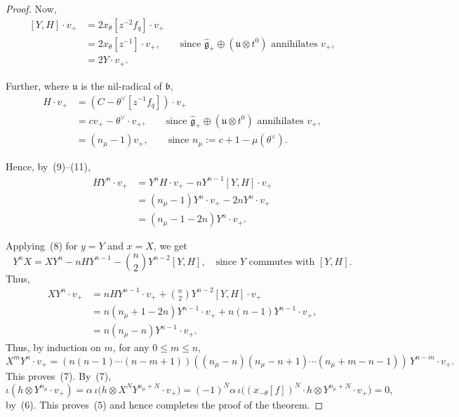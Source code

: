 \documentclass[12pt]{article}
\begin{document}
\begin{proof}
    Now,
    \[
        \begin{aligned}
            [Y,H]\cdot v_+ & = 2x_\theta[z^{-2}f_q]\cdot v_+      \\
                           & = 2x_\theta[z^{-1}]\cdot v_+, \qquad
            \text{since }\widehat{\mathfrak g}_+\oplus(\mathfrak u\otimes t^0)
            \text{ annihilates }v_+,                              \\
                           & =2Y\cdot v_+.
        \end{aligned}
        \tag{10}
    \]

    Further, where $\mathfrak u$ is the nil-radical of $\mathfrak b$,
    \[
        \begin{aligned}
            H\cdot v_+
             & = (C-\theta^\vee[z^{-1}f_q])\cdot v_+ \\
             & = cv_+ - \theta^\vee\cdot v_+, \qquad
            \text{since }\widehat{\mathfrak g}_+\oplus(\mathfrak u\otimes t^0)
            \text{ annihilates }v_+,                 \\
             & =(n_\mu-1)v_+,
            \qquad\text{since }n_\mu:=c+1-\mu(\theta^\vee).
        \end{aligned}
        \tag{11}
    \]

    Hence, by~(9)–(11),
    \[
        \begin{aligned}
            HY^n\cdot v_+
             & =Y^nH\cdot v_+ - nY^{n-1}[Y,H]\cdot v_+ \\
             & =(n_\mu-1)Y^n\cdot v_+ - 2nY^n\cdot v_+ \\
             & =(n_\mu-1-2n)Y^n\cdot v_+.
        \end{aligned}
        \tag{12}
    \]

    Applying~(8) for $y=Y$ and $x=X$, we get
    \[
        Y^nX = XY^n - nHY^{n-1} - \binom{n}{2}Y^{n-2}[Y,H],
        \quad\text{since $Y$ commutes with $[Y,H]$.}
    \]
    Thus,
    \[
        \begin{aligned}
            XY^n\cdot v_+
             & = nHY^{n-1}\cdot v_+
            + \binom{n}{2}Y^{n-2}[Y,H]\cdot v_+ \\
             & = n(n_\mu+1-2n)Y^{n-1}\cdot v_+
            + n(n-1)Y^{n-1}\cdot v_+,           \\
             & = n(n_\mu-n)Y^{n-1}\cdot v_+.
        \end{aligned}
    \]
    Thus, by induction on $m$, for any $0\le m\le n$,
    \[
        X^mY^n\cdot v_+
        = (n(n-1)\cdots(n-m+1))
        ((n_\mu-n)(n_\mu-n+1)\cdots(n_\mu+m-n-1))\,Y^{n-m}\cdot v_+.
    \]
    This proves~(7).  By~(7),
    \[
        \iota(h\otimes Y^{n_\mu}\cdot v_+)
        =\alpha\,\iota\bigl(h\otimes X^N Y^{n_\mu+N}\cdot v_+\bigr)
        =(-1)^N\alpha\,\iota\bigl((x_{-\theta}[f])^N\cdot h\otimes Y^{n_\mu+N}\cdot v_+\bigr)
        =0,
    \]
    by~(6).  This proves~(5) and hence completes the proof of the theorem.
\end{proof}
\end{document}
